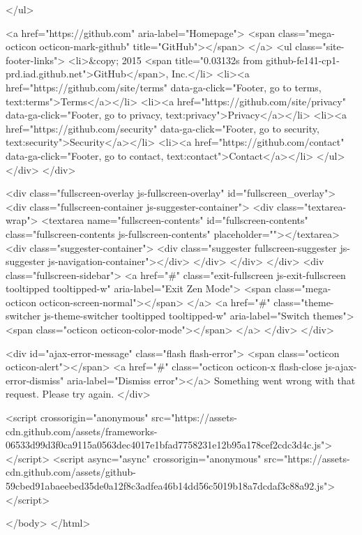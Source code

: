     </ul>

    <a href="https://github.com" aria-label="Homepage">
      <span class="mega-octicon octicon-mark-github" title="GitHub"></span>
</a>
    <ul class="site-footer-links">
      <li>&copy; 2015 <span title="0.03132s from github-fe141-cp1-prd.iad.github.net">GitHub</span>, Inc.</li>
        <li><a href="https://github.com/site/terms" data-ga-click="Footer, go to terms, text:terms">Terms</a></li>
        <li><a href="https://github.com/site/privacy" data-ga-click="Footer, go to privacy, text:privacy">Privacy</a></li>
        <li><a href="https://github.com/security" data-ga-click="Footer, go to security, text:security">Security</a></li>
        <li><a href="https://github.com/contact" data-ga-click="Footer, go to contact, text:contact">Contact</a></li>
    </ul>
  </div>
</div>


    <div class="fullscreen-overlay js-fullscreen-overlay" id="fullscreen_overlay">
  <div class="fullscreen-container js-suggester-container">
    <div class="textarea-wrap">
      <textarea name="fullscreen-contents" id="fullscreen-contents" class="fullscreen-contents js-fullscreen-contents" placeholder=""></textarea>
      <div class="suggester-container">
        <div class="suggester fullscreen-suggester js-suggester js-navigation-container"></div>
      </div>
    </div>
  </div>
  <div class="fullscreen-sidebar">
    <a href="#" class="exit-fullscreen js-exit-fullscreen tooltipped tooltipped-w" aria-label="Exit Zen Mode">
      <span class="mega-octicon octicon-screen-normal"></span>
    </a>
    <a href="#" class="theme-switcher js-theme-switcher tooltipped tooltipped-w"
      aria-label="Switch themes">
      <span class="octicon octicon-color-mode"></span>
    </a>
  </div>
</div>



    
    

    <div id="ajax-error-message" class="flash flash-error">
      <span class="octicon octicon-alert"></span>
      <a href="#" class="octicon octicon-x flash-close js-ajax-error-dismiss" aria-label="Dismiss error"></a>
      Something went wrong with that request. Please try again.
    </div>


      <script crossorigin="anonymous" src="https://assets-cdn.github.com/assets/frameworks-06533d99d3f0ca9115a0563dec4017e1bfad7758231e12b95a178cef2cdc3d4c.js"></script>
      <script async="async" crossorigin="anonymous" src="https://assets-cdn.github.com/assets/github-59cbed91abaeebed35de0a12f8c3adfea46b14dd56c5019b18a7dcdaf3c88a92.js"></script>
      
      

  </body>
</html>

